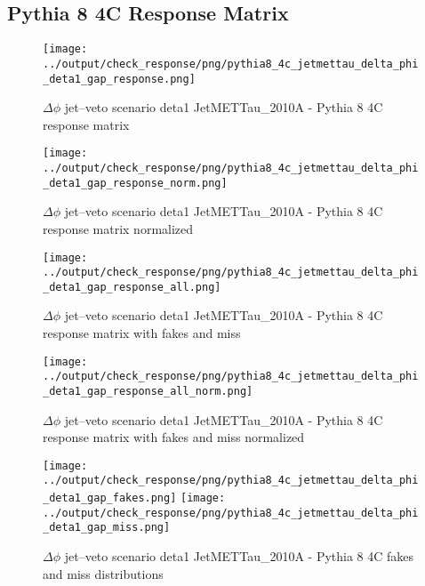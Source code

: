 \documentclass[11pt]{book}
\begin{document}
\clearpage
\subsection{Pythia 8 4C Response Matrix}


\begin{figure}[ht]
\centering
\texttt{[image: ../output/check\_response/png/pythia8\_4c\_jetmettau\_delta\_phi\_deta1\_gap\_response.png]}
\caption{$\Delta\phi$ jet--veto scenario deta1 JetMETTau\_2010A - Pythia 8 4C response matrix}
\label{p8_jetmettau_delta_phi_deta1_gap_response}
\end{figure}

\begin{figure}[ht]
\centering
\texttt{[image: ../output/check\_response/png/pythia8\_4c\_jetmettau\_delta\_phi\_deta1\_gap\_response\_norm.png]}
\caption{$\Delta\phi$ jet--veto scenario deta1 JetMETTau\_2010A - Pythia 8 4C response matrix normalized}
\label{p8_jetmettau_delta_phi_deta1_gap_response_norm}
\end{figure}

\begin{figure}[ht]
\centering
\texttt{[image: ../output/check\_response/png/pythia8\_4c\_jetmettau\_delta\_phi\_deta1\_gap\_response\_all.png]}
\caption{$\Delta\phi$ jet--veto scenario deta1 JetMETTau\_2010A - Pythia 8 4C response matrix with fakes and miss}
\label{p8_jetmettau_delta_phi_deta1_gap_response_all}
\end{figure}

\begin{figure}[ht]
\centering
\texttt{[image: ../output/check\_response/png/pythia8\_4c\_jetmettau\_delta\_phi\_deta1\_gap\_response\_all\_norm.png]}
\caption{$\Delta\phi$ jet--veto scenario deta1 JetMETTau\_2010A - Pythia 8 4C response matrix with fakes and miss normalized}
\label{p8_jetmettau_delta_phi_deta1_gap_response_all_norm}
\end{figure}

\begin{figure}[ht]
\centering
\texttt{[image: ../output/check\_response/png/pythia8\_4c\_jetmettau\_delta\_phi\_deta1\_gap\_fakes.png]}
\texttt{[image: ../output/check\_response/png/pythia8\_4c\_jetmettau\_delta\_phi\_deta1\_gap\_miss.png]}
\caption{$\Delta\phi$ jet--veto scenario deta1 JetMETTau\_2010A - Pythia 8 4C fakes and miss distributions}
\label{p8_jetmettau_delta_phi_deta1_gap_fakesmiss}
\end{figure}
\end{document}
